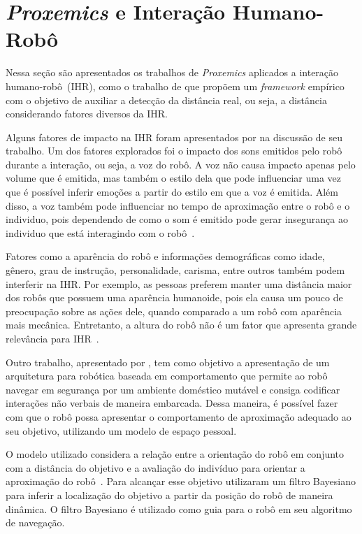 \section{\emph{Proxemics} e Interação Humano-Robô}
\label{sec:proxemicsihr}
Nessa seção são apresentados os trabalhos de \emph{Proxemics} aplicados a interação humano-robô~(IHR), como o trabalho de  que propõem um \emph{framework} empírico com o objetivo de auxiliar a detecção da distância real, ou seja, a distância considerando fatores diversos da IHR.

Alguns fatores de impacto na IHR foram apresentados por  na discussão de seu trabalho. Um dos fatores explorados foi o impacto dos sons emitidos pelo robô durante a interação, ou seja, a voz do robô. A voz não causa impacto apenas pelo volume que é emitida, mas também o estilo dela que pode influenciar uma vez que é possível inferir emoções a partir do estilo em que a voz é emitida. Além disso, a voz também pode influenciar no tempo de aproximação entre o robô e o individuo, pois dependendo de como o som é emitido pode gerar insegurança ao individuo que está interagindo com o robô~\cite{Walters:2009}.

Fatores como a aparência do robô e informações demográficas como idade, gênero, grau de instrução, personalidade, carisma, entre outros também podem interferir na IHR. Por exemplo, as pessoas preferem manter uma distância maior dos robôs que possuem uma aparência humanoide, pois ela causa um pouco de preocupação sobre as ações dele, quando comparado a um robô com aparência mais mecânica. Entretanto, a altura do robô não é um fator que apresenta grande relevância para IHR~\cite{Walters:2009}.

Outro trabalho, apresentado por , tem como objetivo a apresentação de um arquitetura para robótica baseada em comportamento que permite ao robô navegar em segurança por um ambiente doméstico mutável e consiga codificar interações não verbais de maneira embarcada. Dessa maneira, é possível fazer com que o robô possa apresentar o comportamento de aproximação adequado ao seu objetivo, utilizando um modelo de espaço pessoal.

O modelo utilizado considera a relação entre a orientação do robô em conjunto com a distância do objetivo e a avaliação do indivíduo para orientar a aproximação do robô~\cite{Torta:2011}. Para alcançar esse objetivo  utilizaram um filtro Bayesiano para inferir a localização do objetivo a partir da posição do robô de maneira dinâmica. O filtro Bayesiano é utilizado como guia para o robô em seu algoritmo de navegação.

